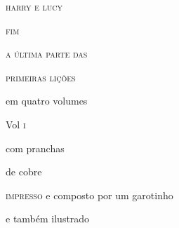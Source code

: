 {{{{{{{{{{{{{{{{{{{\begin{center}
\textsc{harry e lucy}

\textsc{fim}

\textsc{a última parte das}

\bigskip

\textsc{primeiras lições}

\bigskip

em quatro volumes

Vol \textsc{i}

com pranchas

de cobre

\medskip

\textsc{impresso} e composto por um garotinho

e também ilustrado

\end{center}

}}}}}}}}}}}}}}}}}}}

